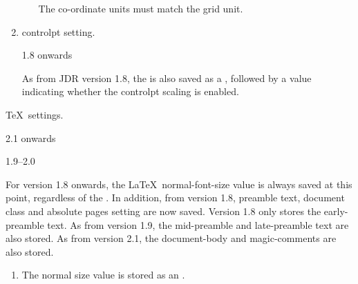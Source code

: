 \begin{numbered}
\begin{enumerate}
\begin{enumerate}
     The co-ordinate units must match the grid unit.

    \end{enumerate}

    \item \Gls{controlpt} setting.
  \begin{jdrversion}{1.8 onwards}
  \begin{syntaxline}
   
  \end{syntaxline}
  As from JDR version 1.8, the  is also saved as a
  , followed by a  value 
  indicating whether the \gls{controlpt} scaling is enabled.
  \end{jdrversion}

  \end{enumerate}%

\item\label{jdr:imagetex}\TeX\ settings.
\begin{jdrversion}{2.1 onwards}
\begin{syntaxline}
  
   
\end{syntaxline}
\end{jdrversion}
\begin{jdrversion}{1.9--2.0}
\begin{syntaxline}
  
 
\end{syntaxline}
\end{jdrversion}
\begin{jdrversion}{1.8}
\begin{syntaxline}
  
\end{syntaxline}
\end{jdrversion}
For version 1.8 onwards, the \LaTeX\ \gls{normal-font-size} value is always
saved at this point, regardless of the
\hyperref[jdr:settings-id]{}.  In addition, from
version 1.8, preamble text, document class and absolute pages
setting are now saved. Version 1.8 only stores the \gls{early-preamble}
text.  As from version 1.9, the \gls{mid-preamble} and
\gls{late-preamble} text are also stored. As from version 2.1, 
the \gls{document-body} and \glspl{magic-comment} are also stored.
\begin{enumerate}
\item The normal size value  is stored as an .


\end{enumerate}
\end{numbered}
